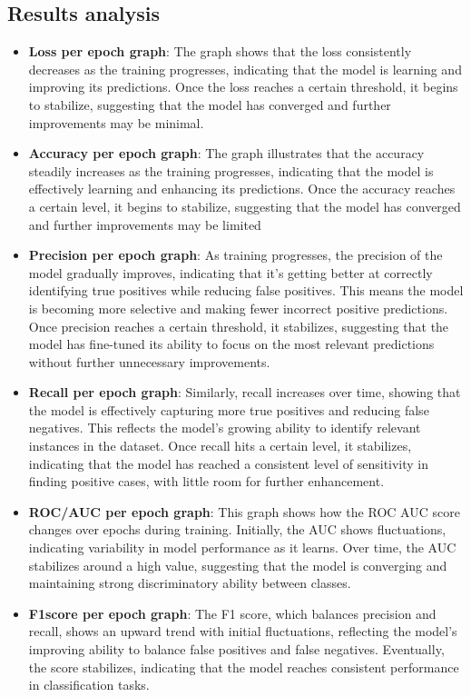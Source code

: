 \documentclass[a4paper,oneside,11pt]{book}
\begin{document}
\subsection{Results analysis}
\begin{itemize}
    \item \textbf{Loss per epoch graph}: The graph shows that the loss consistently decreases as the training progresses, indicating that the model is learning and improving its predictions. Once the loss reaches a certain threshold, it begins to stabilize, suggesting that the model has converged and further improvements may be minimal.
    \item \textbf{Accuracy per epoch graph}: The graph illustrates that the accuracy steadily increases as the training progresses, indicating that the model is effectively learning and enhancing its predictions. Once the accuracy reaches a certain level, it begins to stabilize, suggesting that the model has converged and further improvements may be limited
    \item \textbf{Precision per epoch graph}: As training progresses, the precision of the model gradually improves, indicating that it's getting better at correctly identifying true positives while reducing false positives. This means the model is becoming more selective and making fewer incorrect positive predictions. Once precision reaches a certain threshold, it stabilizes, suggesting that the model has fine-tuned its ability to focus on the most relevant predictions without further unnecessary improvements.
    \item \textbf{Recall per epoch graph}: Similarly, recall increases over time, showing that the model is effectively capturing more true positives and reducing false negatives. This reflects the model's growing ability to identify relevant instances in the dataset. Once recall hits a certain level, it stabilizes, indicating that the model has reached a consistent level of sensitivity in finding positive cases, with little room for further enhancement.
    \item \textbf{ROC/AUC per epoch graph}: This graph shows how the ROC AUC score changes over epochs during training. Initially, the AUC shows fluctuations, indicating variability in model performance as it learns. Over time, the AUC stabilizes around a high value, suggesting that the model is converging and maintaining strong discriminatory ability between classes.
    \item \textbf{F1score per epoch graph}: The F1 score, which balances precision and recall, shows an upward trend with initial fluctuations, reflecting the model's improving ability to balance false positives and false negatives. Eventually, the score stabilizes, indicating that the model reaches consistent performance in classification tasks.

\end{itemize}
\end{document}
